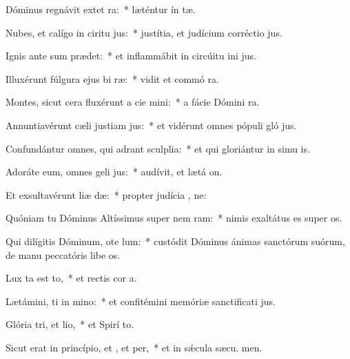 \item Dóminus regnávit extet ra:~* læténtur ín tæ.
\item Nubes, et calígo in ciritu jus:~* justítia, et judícium corréctio  jus.
\item Ignis ante sum prædet:~* et inflammábit in circúitu ini jus.
\item Illuxérunt fúlgura ejus bi ræ:~* vidit et commó  ra.
\item Montes, sicut cera fluxérunt a cie mini:~* a fácie Dómini  ra.
\item Annuntiavérunt cæli justiam jus:~* et vidérunt omnes pópuli gló jus.
\item Confundántur omnes, qui adrant sculplia:~* et qui gloriántur in simu is.
\item Adoráte eum, omnes geli jus:~* audívit, et lætá  on.
\item Et exsultavérunt liæ dæ:~* propter judícia , ne:
\item Quóniam tu Dóminus Altíssimus super nem ram:~* nimis exaltátus es super  os.
\item Qui dilígitis Dóminum, ote lum:~* custódit Dóminus ánimas sanctórum suórum, de manu peccatóris libe os.
\item Lux ta est to,~* et rectis cor a.
\item Lætámini, ti in mino:~* et confitémini memóriæ sanctificati jus.
\item Glória tri, et lio,~* et Spirí to.
\item Sicut erat in princípio, et , et per,~* et in sǽcula sæcu. men.
